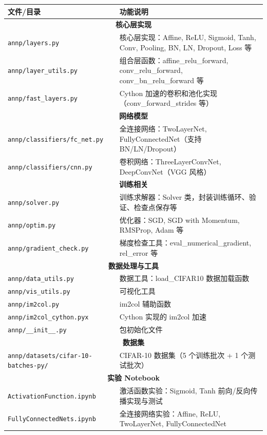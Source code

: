 \documentclass[a4paper]{article}
\begin{document}
\begin{longtable}{l|l}
\toprule
\textbf{文件/目录} & \textbf{功能说明} \\
\midrule
\multicolumn{2}{c}{\textbf{核心层实现}} \\
\midrule
\texttt{annp/layers.py} & 核心层实现：Affine, ReLU, Sigmoid, Tanh, Conv, Pooling, BN, LN, Dropout, Loss 等 \\
\texttt{annp/layer\_utils.py} & 组合层函数：affine\_relu\_forward, conv\_relu\_forward, conv\_bn\_relu\_forward 等 \\
\texttt{annp/fast\_layers.py} & Cython 加速的卷积和池化实现（conv\_forward\_strides 等） \\
\midrule
\multicolumn{2}{c}{\textbf{网络模型}} \\
\midrule
\texttt{annp/classifiers/fc\_net.py} & 全连接网络：TwoLayerNet, FullyConnectedNet（支持 BN/LN/Dropout） \\
\texttt{annp/classifiers/cnn.py} & 卷积网络：ThreeLayerConvNet, DeepConvNet（VGG 风格） \\
\midrule
\multicolumn{2}{c}{\textbf{训练相关}} \\
\midrule
\texttt{annp/solver.py} & 训练求解器：Solver 类，封装训练循环、验证、检查点保存等 \\
\texttt{annp/optim.py} & 优化器：SGD, SGD with Momentum, RMSProp, Adam 等 \\
\texttt{annp/gradient\_check.py} & 梯度检查工具：eval\_numerical\_gradient, rel\_error 等 \\
\midrule
\multicolumn{2}{c}{\textbf{数据处理与工具}} \\
\midrule
\texttt{annp/data\_utils.py} & 数据工具：load\_CIFAR10 数据加载函数 \\
\texttt{annp/vis\_utils.py} & 可视化工具 \\
\texttt{annp/im2col.py} & im2col 辅助函数 \\
\texttt{annp/im2col\_cython.pyx} & Cython 实现的 im2col 加速 \\
\texttt{annp/\_\_init\_\_.py} & 包初始化文件 \\
\midrule
\multicolumn{2}{c}{\textbf{数据集}} \\
\midrule
\texttt{annp/datasets/cifar-10-batches-py/} & CIFAR-10 数据集（5 个训练批次 + 1 个测试批次） \\
\midrule
\multicolumn{2}{c}{\textbf{实验 Notebook}} \\
\midrule
\texttt{ActivationFunction.ipynb} & 激活函数实验：Sigmoid, Tanh 前向/反向传播实现与测试 \\
\texttt{FullyConnectedNets.ipynb} & 全连接网络实验：Affine, ReLU, TwoLayerNet, FullyConnectedNet \\

\end{longtable}
\end{document}
